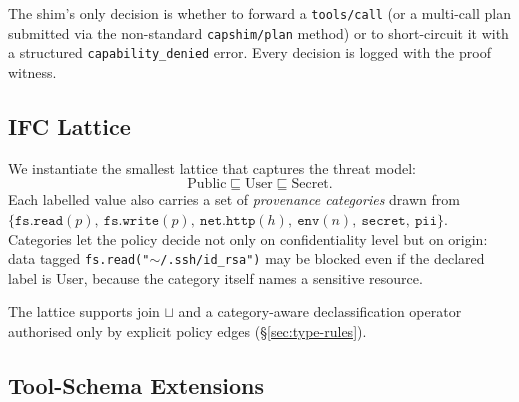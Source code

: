 \documentclass[11pt,a4paper]{article}
\begin{document}
\begin{center}
\end{center}

The shim's only decision is whether to forward a \texttt{tools/call}
(or a multi-call plan submitted via the non-standard
\texttt{capshim/plan} method) or to short-circuit it with a
structured \texttt{capability\_denied} error. Every decision is
logged with the proof witness.

\subsection{IFC Lattice}

We instantiate the smallest lattice that captures the threat model:
\[
\text{Public} \sqsubseteq \text{User} \sqsubseteq \text{Secret}.
\]
Each labelled value also carries a set of \emph{provenance
categories} drawn from $\{\texttt{fs.read}(p),\
\texttt{fs.write}(p),\ \texttt{net.http}(h),\ \texttt{env}(n),\
\texttt{secret},\ \texttt{pii}\}$. Categories let the policy decide
not only on confidentiality level but on origin: data tagged
\texttt{fs.read("$\sim$/.ssh/id\_rsa")} may be blocked even if the
declared label is User, because the category itself names a
sensitive resource.

The lattice supports join $\sqcup$ and a category-aware
declassification operator authorised only by explicit policy
edges (\S\ref{sec:type-rules}).

\subsection{Tool-Schema Extensions}
\end{document}
